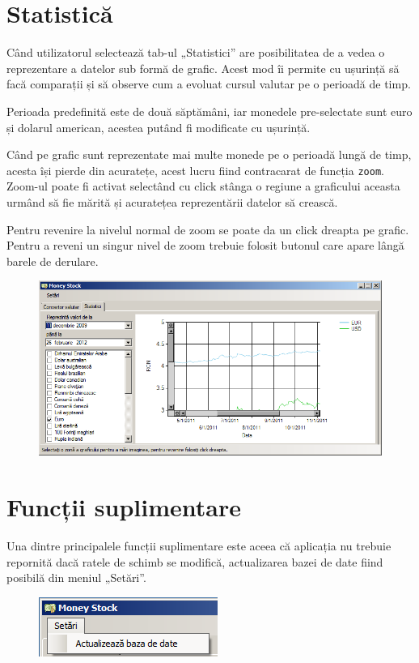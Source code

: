 \documentclass[13pt,a4paper]{report}
\begin{document}
\section{Statistică}
Când utilizatorul selectează tab-ul „Statistici” are posibilitatea de a vedea o
reprezentare a datelor sub formă de grafic.
Acest mod îi permite cu ușurință să facă comparații și să observe cum a evoluat
cursul valutar pe o perioadă de timp.

Perioada predefinită este de două săptămâni, iar monedele pre-selectate sunt
euro și dolarul american, acestea putând fi modificate cu ușurință.

Când pe grafic sunt reprezentate mai multe monede pe o perioadă lungă de timp,
acesta își pierde din acuratețe, acest lucru fiind contracarat de funcția
\texttt{zoom}.
Zoom-ul poate fi activat selectând cu click stânga o regiune a graficului
aceasta urmând să fie mărită și acuratețea reprezentării datelor să crească.

Pentru revenire la nivelul normal de zoom se poate da un click dreapta pe
grafic. Pentru a reveni un singur nivel de zoom trebuie folosit butonul 
care apare lângă barele de derulare.

\begin{figure}[htb]
\centering
\includegraphics[width=1\textwidth]{img/zoom.png}
\end{figure}

\section{Funcții suplimentare}
Una dintre principalele funcții suplimentare este aceea că aplicația nu trebuie
repornită dacă ratele de schimb se modifică, actualizarea bazei de date fiind
posibilă din meniul „Setări”.

\begin{figure}[htb]
\centering
\includegraphics[scale=0.65]{img/settings.png}
\end{figure}
\end{document}

